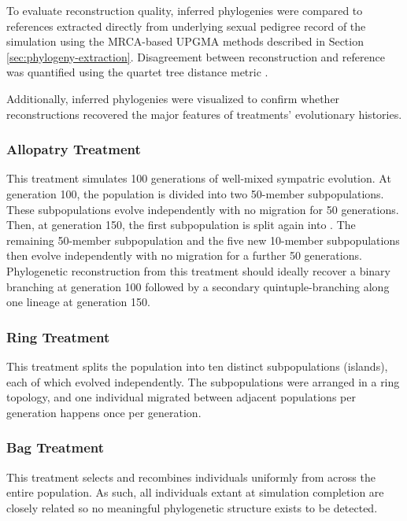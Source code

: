 To evaluate reconstruction quality, inferred phylogenies were compared to references extracted directly from underlying sexual pedigree record of the simulation using the MRCA-based UPGMA methods described in Section \ref{sec:phylogeny-extraction}.
Disagreement between reconstruction and reference was quantified using the quartet tree distance metric \citep{estabrook1985comparison}.

Additionally, inferred phylogenies were visualized to confirm whether reconstructions recovered the major features of treatments' evolutionary histories.

\subsubsection{Allopatry Treatment}

This treatment simulates 100 generations of well-mixed sympatric evolution.
At generation 100, the population is divided into two 50-member subpopulations.
These subpopulations evolve independently with no migration for 50 generations.
Then, at generation 150, the first subpopulation is split again into .
The remaining 50-member subpopulation and the five new 10-member subpopulations then evolve independently with no migration for a further 50 generations.
Phylogenetic reconstruction from this treatment should ideally recover a binary branching at generation 100 followed by a secondary quintuple-branching along one lineage at generation 150.

\subsubsection{Ring Treatment}

This treatment splits the population into ten distinct subpopulations (islands), each of which evolved independently.
The subpopulations were arranged in a ring topology, and one individual migrated between adjacent populations per generation happens once per generation.

\subsubsection{Bag Treatment}

This treatment selects and recombines individuals uniformly from across the entire population.
As such, all individuals extant at simulation completion are closely related so no meaningful phylogenetic structure exists to be detected.


